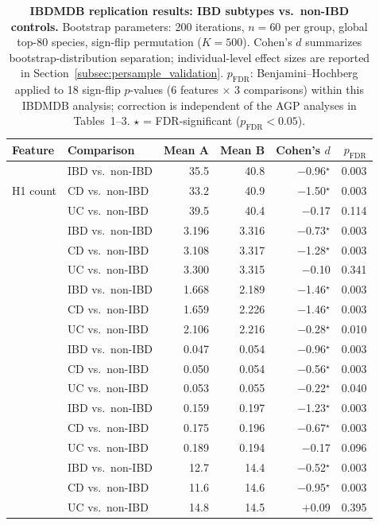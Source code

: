 \begin{table}[H]
\centering
\caption{%
  \textbf{IBDMDB replication results: IBD subtypes vs.\ non-IBD controls.}
  Bootstrap parameters: 200 iterations, $n = 60$ per group, global top-80
  species, sign-flip permutation ($K = 500$).
  Cohen's $d$ summarizes bootstrap-distribution separation; individual-level
  effect sizes are reported in Section~\ref{subsec:persample_validation}.
  $p_\text{FDR}$: Benjamini--Hochberg applied to 18 sign-flip $p$-values
  (6 features $\times$ 3 comparisons) within this IBDMDB analysis;
  correction is independent of the AGP analyses in Tables~1--3.
  $\star$ = FDR-significant ($p_\text{FDR} < 0.05$).
}
\label{tab:ibdmdb_results}
\small
\setlength{\tabcolsep}{4pt}
\begin{tabular}{llrrrr}
\toprule
\textbf{Feature} & \textbf{Comparison}
  & \textbf{Mean A} & \textbf{Mean B}
  & \textbf{Cohen's $d$} & \boldmath$p_\text{FDR}$ \\
\midrule
\multirow{3}{*}{H1 count}
  & IBD vs.\ non-IBD  & 35.5 & 40.8 & $-$0.96$^\star$ & 0.003 \\
  & CD vs.\ non-IBD   & 33.2 & 40.9 & $-$1.50$^\star$ & 0.003 \\
  & UC vs.\ non-IBD   & 39.5 & 40.4 & $-$0.17         & 0.114 \\
\addlinespace
\multirow{3}{*}{H1 entropy}
  & IBD vs.\ non-IBD  & 3.196 & 3.316 & $-$0.73$^\star$ & 0.003 \\
  & CD vs.\ non-IBD   & 3.108 & 3.317 & $-$1.28$^\star$ & 0.003 \\
  & UC vs.\ non-IBD   & 3.300 & 3.315 & $-$0.10         & 0.341 \\
\addlinespace
\multirow{3}{*}{Total persistence}
  & IBD vs.\ non-IBD  & 1.668 & 2.189 & $-$1.46$^\star$ & 0.003 \\
  & CD vs.\ non-IBD   & 1.659 & 2.226 & $-$1.46$^\star$ & 0.003 \\
  & UC vs.\ non-IBD   & 2.106 & 2.216 & $-$0.28$^\star$ & 0.010 \\
\addlinespace
\multirow{3}{*}{Mean lifetime}
  & IBD vs.\ non-IBD  & 0.047 & 0.054 & $-$0.96$^\star$ & 0.003 \\
  & CD vs.\ non-IBD   & 0.050 & 0.054 & $-$0.56$^\star$ & 0.003 \\
  & UC vs.\ non-IBD   & 0.053 & 0.055 & $-$0.22$^\star$ & 0.040 \\
\addlinespace
\multirow{3}{*}{Max lifetime}
  & IBD vs.\ non-IBD  & 0.159 & 0.197 & $-$1.23$^\star$ & 0.003 \\
  & CD vs.\ non-IBD   & 0.175 & 0.196 & $-$0.67$^\star$ & 0.003 \\
  & UC vs.\ non-IBD   & 0.189 & 0.194 & $-$0.17         & 0.096 \\
\addlinespace
\multirow{3}{*}{Max Betti-1}
  & IBD vs.\ non-IBD  & 12.7 & 14.4  & $-$0.52$^\star$ & 0.003 \\
  & CD vs.\ non-IBD   & 11.6 & 14.6  & $-$0.95$^\star$ & 0.003 \\
  & UC vs.\ non-IBD   & 14.8 & 14.5  & $+$0.09         & 0.395 \\
\bottomrule
\end{tabular}
\end{table}


